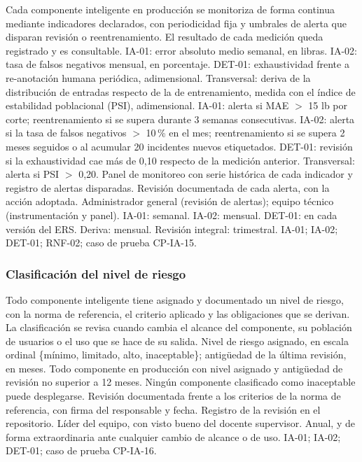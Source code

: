 \documentclass[11pt,a4paper]{article}
\begin{document}
{Cada componente inteligente en producción se monitoriza de forma continua
mediante indicadores declarados, con periodicidad fija y umbrales de alerta
que disparan revisión o reentrenamiento. El resultado de cada medición queda
registrado y es consultable.}
{IA-01: error absoluto medio semanal, en libras. IA-02: tasa de falsos
negativos mensual, en porcentaje. DET-01: exhaustividad frente a
re-anotación humana periódica, adimensional. Transversal: deriva de la
distribución de entradas respecto de la de entrenamiento, medida con el índice
de estabilidad poblacional (PSI), adimensional.}
{IA-01: alerta si MAE $>$ 15 lb por corte; reentrenamiento si se supera
durante 3 semanas consecutivas. IA-02: alerta si la tasa de falsos negativos
$>$ 10\,\% en el mes; reentrenamiento si se supera 2 meses seguidos o al
acumular 20 incidentes nuevos etiquetados. DET-01: revisión si la
exhaustividad cae más de 0,10 respecto de la medición anterior. Transversal:
alerta si PSI $>$ 0,20.}
{Panel de monitoreo con serie histórica de cada indicador y registro de
alertas disparadas. Revisión documentada de cada alerta, con la acción
adoptada.}
{Administrador general (revisión de alertas); equipo técnico
(instrumentación y panel).}
{IA-01: semanal. IA-02: mensual. DET-01: en cada versión del ERS.
Deriva: mensual. Revisión integral: trimestral.}
{IA-01; IA-02; DET-01; RNF-02; caso de prueba CP-IA-15.}

\subsubsection{Clasificación del nivel de riesgo}

{Todo componente inteligente tiene asignado y documentado un nivel de riesgo,
con la norma de referencia, el criterio aplicado y las obligaciones que se
derivan. La clasificación se revisa cuando cambia el alcance del componente,
su población de usuarios o el uso que se hace de su salida.}
{Nivel de riesgo asignado, en escala ordinal \{mínimo, limitado, alto,
inaceptable\}; antigüedad de la última revisión, en meses.}
{Todo componente en producción con nivel asignado y antigüedad de revisión
no superior a 12 meses. Ningún componente clasificado como inaceptable puede
desplegarse.}
{Revisión documentada frente a los criterios de la norma de referencia, con
firma del responsable y fecha. Registro de la revisión en el repositorio.}
{Líder del equipo, con visto bueno del docente supervisor.}
{Anual, y de forma extraordinaria ante cualquier cambio de alcance o de uso.}
{IA-01; IA-02; DET-01; caso de prueba CP-IA-16.}
\end{document}
